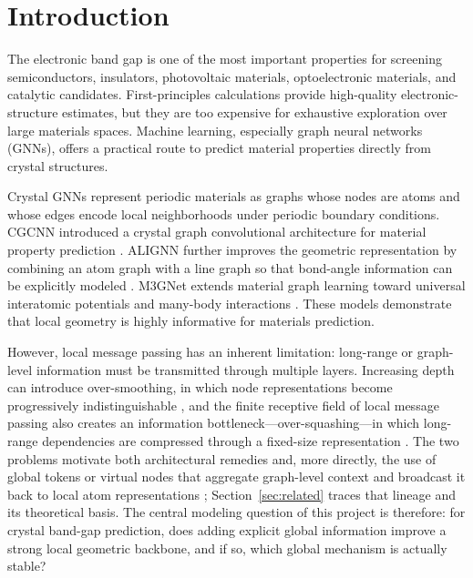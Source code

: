 \documentclass[a4paper,11pt]{article}
\begin{document}
\section{Introduction}

The electronic band gap is one of the most important properties for screening semiconductors, insulators, photovoltaic materials, optoelectronic materials, and catalytic candidates. First-principles calculations provide high-quality electronic-structure estimates, but they are too expensive for exhaustive exploration over large materials spaces. Machine learning, especially graph neural networks (GNNs), offers a practical route to predict material properties directly from crystal structures.

Crystal GNNs represent periodic materials as graphs whose nodes are atoms and whose edges encode local neighborhoods under periodic boundary conditions. CGCNN introduced a crystal graph convolutional architecture for material property prediction \cite{xie2018cgcnn}. ALIGNN further improves the geometric representation by combining an atom graph with a line graph so that bond-angle information can be explicitly modeled \cite{choudhary2021alignn}. M3GNet extends material graph learning toward universal interatomic potentials and many-body interactions \cite{chen2022m3gnet}. These models demonstrate that local geometry is highly informative for materials prediction.

However, local message passing has an inherent limitation: long-range or graph-level information must be transmitted through multiple layers. Increasing depth can introduce over-smoothing, in which node representations become progressively indistinguishable \cite{li2018deeper,oono2020graph,rusch2023survey}, and the finite receptive field of local message passing also creates an information bottleneck---over-squashing---in which long-range dependencies are compressed through a fixed-size representation \cite{alon2021bottleneck,topping2022understanding}. The two problems motivate both architectural remedies \cite{zhao2020pairnorm,rong2020dropedge,chen2020gcnii,xu2018jknet} and, more directly, the use of global tokens or virtual nodes that aggregate graph-level context and broadcast it back to local atom representations \cite{gilmer2017neural,battaglia2018relational,ying2021transformers,cai2023connection,southern2024understanding}; Section~\ref{sec:related} traces that lineage and its theoretical basis. The central modeling question of this project is therefore: for crystal band-gap prediction, does adding explicit global information improve a strong local geometric backbone, and if so, which global mechanism is actually stable?
\end{document}
